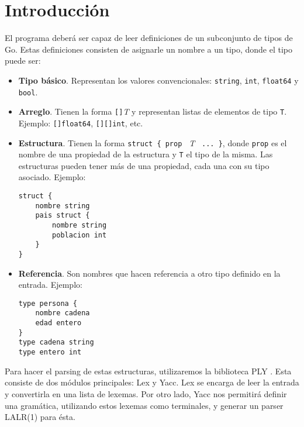 
\hypertarget{sec:intro}{\section{Introducción}}
\label{sec:intro}

    El programa deberá ser capaz de leer definiciones de un subconjunto de tipos de Go. Estas definiciones consisten de asignarle un nombre a un tipo, donde el tipo puede ser:

\begin{itemize}
    \item \textbf{Tipo básico}. Representan los valores convencionales: \texttt{string}, \texttt{int}, \texttt{float64} y \texttt{bool}.
    \item \textbf{Arreglo}. Tienen la forma \texttt{[]}\textit{T} y representan listas de elementos de tipo \texttt{T}. Ejemplo: \texttt{[]float64}, \texttt{[][]int}, etc. 
    \item \textbf{Estructura}. Tienen la forma \texttt{struct \{ prop } \textit{T} \texttt{ ... \}}, donde \texttt{prop} es el nombre de una propiedad de la estructura y \texttt{T} el tipo de la misma. Las estructuras pueden tener más de una propiedad, cada una con su tipo asociado. Ejemplo:
    \begin{verbatim}
struct {
    nombre string
    pais struct {
        nombre string
        poblacion int
    }
}
    \end{verbatim}
    \item \textbf{Referencia}. Son nombres que hacen referencia a otro tipo definido en la entrada. Ejemplo:
    \begin{verbatim}
type persona {
    nombre cadena
    edad entero
}
type cadena string
type entero int
    \end{verbatim}
\end{itemize}

    Para hacer el parsing de estas estructuras, utilizaremos la biblioteca PLY \cite{PLY}. Esta consiste de dos módulos principales: Lex y Yacc. Lex se encarga de leer la entrada y convertirla en una lista de lexemas. Por otro lado, Yacc nos permitirá definir una gramática, utilizando estos lexemas como terminales, y generar un parser LALR(1) para ésta.